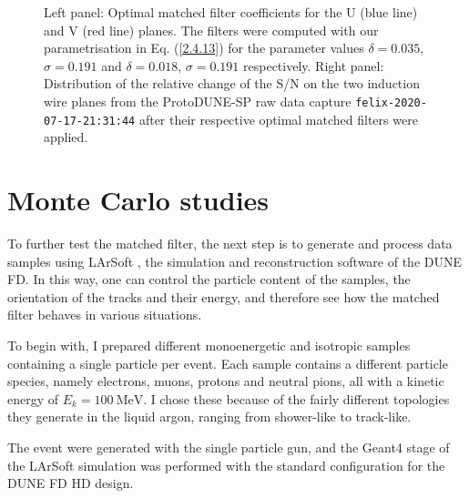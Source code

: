 \begin{figure}[t]
\begin{subfigure}{0.5\textwidth}
	\end{subfigure}
	\caption[Distribution of the relative change of the S/N on the induction planes from the ProtoDUNE-SP raw data capture after their respective optimal matched filters were applied.]{Left panel: Optimal matched filter coefficients for the U (blue line) and V (red line) planes. The filters were computed with our parametrisation in Eq. (\ref{2.4.13}) for the parameter values $\delta = 0.035$, $\sigma = 0.191$ and $\delta = 0.018$, $\sigma = 0.191$ respectively. Right panel: Distribution of the relative change of the S/N on the two induction wire planes from the ProtoDUNE-SP raw data capture \texttt{felix-2020-07-17-21:31:44} after their respective optimal matched filters were applied.}
	\label{fig:mf_perf}
\end{figure}

\section{Monte Carlo studies}
\label{sec:matched_filter_mc_studies}

To further test the matched filter, the next step is to generate and process data samples using LArSoft \cite{Church2013}, the simulation and reconstruction software of the DUNE FD. In this way, one can control the particle content of the samples, the orientation of the tracks and their energy, and therefore see how the matched filter behaves in various situations.

To begin with, I prepared different monoenergetic and isotropic samples containing a single particle per event. Each sample contains a different particle species, namely electrons, muons, protons and neutral pions, all with a kinetic energy of $E_{k} = 100 \ \mathrm{MeV}$. I chose these because of the fairly different topologies they generate in the liquid argon, ranging from shower-like to track-like.

The event were generated with the single particle gun, and the Geant4 stage of the LArSoft simulation \cite{Church2013} was performed with the standard configuration for the DUNE FD HD design.

